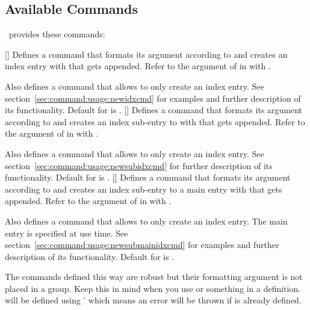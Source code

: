 \documentclass[load-preamble,add-index,scrartcl={DIV10}]{cnltx-doc}
\begin{document}
\subsection{Available Commands}
\idxcmds\ provides these commands:
\begin{commands}
  []
    Defines a command  that formats its argument according to
     and creates an index entry with 
    that gets  appended.  Refer to the argument of 
    in  with .
    
    Also defines a command  that allows to only create an
    index entry.  See section~\ref{sec:command:usage:newidxcmd} for examples
    and further description of its functionality.  Default for 
    is .
  [\sarg{}]
    Defines a command  that formats its argument according to
     and creates an index sub-entry to 
    with  that gets  appended.  Refer to the
    argument of  in  with .
    
    Also defines a command  that allows to only create an
    index entry.  See section~\ref{sec:command:usage:newsubidxcmd} for further
    description of its functionality. Default for  is
    .
  []
    Defines a command  that formats its argument according to
     and creates an index sub-entry to a main entry with
     that gets  appended.  Refer to the argument
    of  in  with .
    
    Also defines a command  that allows to only create an
    index entry.  The main entry is specified at use time. See
    section~\ref{sec:command:usage:newsubmainidxcmd} for examples and further
    description of its functionality. Default for  is
    .
\end{commands}

The commands  defined this way are robust but their formatting
argument is not placed in a group.  Keep this in mind when you use
 or something in a definition.   will be defined using
'  which means an error will be thrown if
 is already defined.
\end{document}
